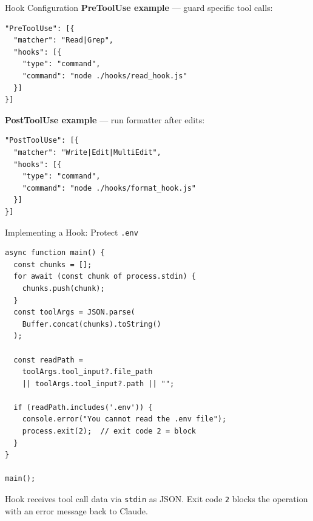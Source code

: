\documentclass[aspectratio=169]{beamer}
\begin{document}
\begin{frame}[fragile]{Hook Configuration}
\textbf{PreToolUse example} --- guard specific tool calls:
\begin{lstlisting}[]
"PreToolUse": [{
  "matcher": "Read|Grep",
  "hooks": [{
    "type": "command",
    "command": "node ./hooks/read_hook.js"
  }]
}]
\end{lstlisting}
\smallskip
\textbf{PostToolUse example} --- run formatter after edits:
\begin{lstlisting}[]
"PostToolUse": [{
  "matcher": "Write|Edit|MultiEdit",
  "hooks": [{
    "type": "command",
    "command": "node ./hooks/format_hook.js"
  }]
}]
\end{lstlisting}
\end{frame}

\begin{frame}[fragile]{Implementing a Hook: Protect \texttt{.env}}
\begin{lstlisting}[]
async function main() {
  const chunks = [];
  for await (const chunk of process.stdin) {
    chunks.push(chunk);
  }
  const toolArgs = JSON.parse(
    Buffer.concat(chunks).toString()
  );

  const readPath =
    toolArgs.tool_input?.file_path
    || toolArgs.tool_input?.path || "";

  if (readPath.includes('.env')) {
    console.error("You cannot read the .env file");
    process.exit(2);  // exit code 2 = block
  }
}

main();
\end{lstlisting}

\footnotesize
Hook receives tool call data via \texttt{stdin} as JSON. Exit code \texttt{2} blocks the operation with an error message back to Claude.
\end{frame}
\end{document}
